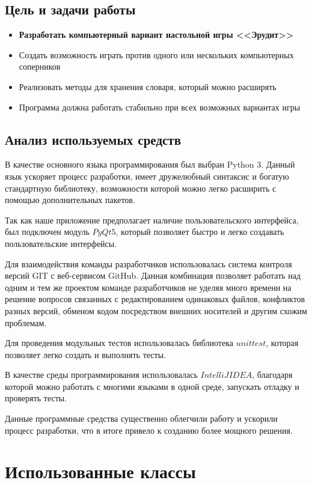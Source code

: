 \documentclass[a4paper,14pt]{article}
\begin{document}
	\subsection{Цель и задачи работы}
	\begin{itemize}
		\item \textbf{Разработать компьютерный вариант настольной игры <<Эрудит>>}
		\item Создать возможность играть против одного или нескольких компьютерных соперников
		\item Реализовать методы для хранения словаря, который можно расширять
		\item Программа должна работать стабильно при всех возможных вариантах игры
	\end{itemize}

	\subsection{Анализ используемых средств}
	В качестве основного языка программирования был выбран Python 3. Данный язык ускоряет процесс разработки, имеет дружелюбный синтаксис и богатую стандартную библиотеку, возможности которой можно легко расширить с помощью дополнительных пакетов.
	
	Так как наше приложение предполагает наличие пользовательского интерфейса, был подключен модуль $PyQt5$, который позволяет быстро и легко создавать пользовательские интерфейсы.
	
	Для взаимодействия команды разработчиков использовалась система контроля версий GIT с веб-сервисом GitHub. Данная комбинация позволяет работать над одним и тем же проектом команде разработчиков не уделяя много времени на решение вопросов связанных с редактированием одинаковых файлов, конфликтов разных версий, обменом кодом посредством внешних носителей и другим схожим проблемам.
	
	Для проведения модульных тестов использовалась библиотека $unittest$, которая позволяет легко создать и выполнять тесты.
	
	В качестве среды программирования использовалась $IntelliJ IDEA$, благодаря которой можно работать с многими языками в одной среде, запускать отладку и проверять тесты.
	
	Данные программные средства существенно облегчили работу  и ускорили процесс разработки, что в итоге привело к созданию более мощного решения.
\section{Использованные классы}	
\end{document}
